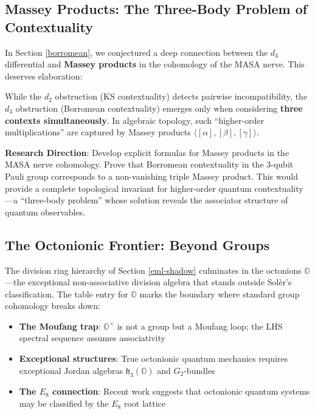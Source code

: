 \documentclass[11pt]{article}
\begin{document}
\subsection{Massey Products: The Three-Body Problem of Contextuality}
\label{massey}

In Section \ref{borromean}, we conjectured a deep connection between the $d_3$ differential and \textbf{Massey products} in the cohomology of the MASA nerve. This deserves elaboration:

While the $d_2$ obstruction (KS contextuality) detects pairwise incompatibility, the $d_3$ obstruction (Borromean contextuality) emerges only when considering \textbf{three contexts simultaneously}. In algebraic topology, such ``higher-order multiplications'' are captured by Massey products $\langle [\alpha], [\beta], [\gamma] \rangle$.

\textbf{Research Direction}: Develop explicit formulas for Massey products in the MASA nerve cohomology. Prove that Borromean contextuality in the 3-qubit Pauli group corresponds to a non-vanishing triple Massey product. This would provide a complete topological invariant for higher-order quantum contextuality---a ``three-body problem'' whose solution reveals the associator structure of quantum observables.

\subsection{The Octonionic Frontier: Beyond Groups}
\label{octonionic}

The division ring hierarchy of Section \ref{eml-shadow} culminates in the octonions $\mathbb{O}$---the exceptional non-associative division algebra that stands outside Sol\`{e}r's classification. The table entry for $\mathbb{O}$ marks the boundary where standard group cohomology breaks down:

\begin{itemize}
\item \textbf{The Moufang trap}: $\mathbb{O}^\times$ is not a group but a Moufang loop; the LHS spectral sequence assumes associativity
\item \textbf{Exceptional structures}: True octonionic quantum mechanics requires exceptional Jordan algebras $\mathfrak{h}_3(\mathbb{O})$ and $G_2$-bundles
\item \textbf{The $E_8$ connection}: Recent work suggests that octonionic quantum systems may be classified by the $E_8$ root lattice
\end{itemize}
\end{document}
